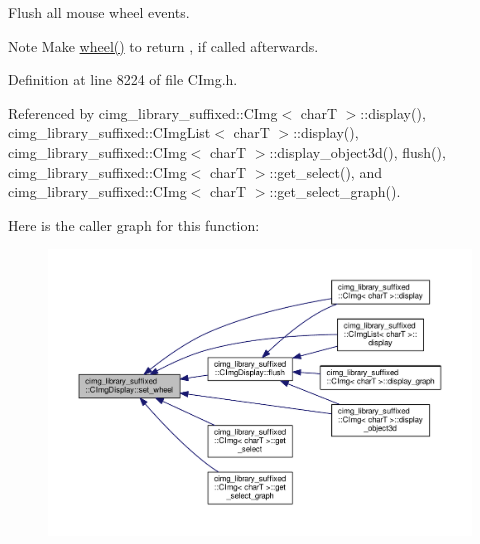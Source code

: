 Flush all mouse wheel events. 

\begin{DoxyNote}{Note}
Make \hyperlink{structcimg__library__suffixed_1_1CImgDisplay_a652c48e6e55a89bc96c9ae24c99a828e}{wheel()} to return {}, if called afterwards. 
\end{DoxyNote}


Definition at line 8224 of file C\+Img.\+h.



Referenced by cimg\+\_\+library\+\_\+suffixed\+::\+C\+Img$<$ char\+T $>$\+::display(), cimg\+\_\+library\+\_\+suffixed\+::\+C\+Img\+List$<$ char\+T $>$\+::display(), cimg\+\_\+library\+\_\+suffixed\+::\+C\+Img$<$ char\+T $>$\+::display\+\_\+object3d(), flush(), cimg\+\_\+library\+\_\+suffixed\+::\+C\+Img$<$ char\+T $>$\+::get\+\_\+select(), and cimg\+\_\+library\+\_\+suffixed\+::\+C\+Img$<$ char\+T $>$\+::get\+\_\+select\+\_\+graph().

Here is the caller graph for this function\+:
\nopagebreak
\begin{figure}[H]
\begin{center}
\leavevmode
\includegraphics[width=350pt]{d5/d53/structcimg__library__suffixed_1_1CImgDisplay_a4ce1d2c8224658626b37215edfe58ad8_icgraph}
\end{center}
\end{figure}
\mbox{\label{structcimg__library__suffixed_1_1CImgDisplay_a186d7f873b9a3340900a46149533cb4f}} 

